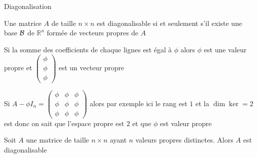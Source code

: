 \begin{parag}{Diagonalisation}
    \begin{theoreme}
        Une matrice $A$ de taille $n \times n$ est diagonalisable si et seulement s'il existe une base $\mathcal{B}$ de $\mathbb{R}^n$ formée de vecteurs propres de $A$
    \end{theoreme}
    \begin{truc}
        Si la somme des coefficients de chaque lignes est égal à $\phi$ alors $\phi$ est une valeur propre et $\begin{pmatrix}
            \phi \\ \phi \\ \phi
        \end{pmatrix}$ est un vecteur propre
    \end{truc}
    \begin{truc}
        Si $A - \phi I_n = \begin{pmatrix}
            \phi & \phi & \phi\\
            \phi & \phi & \phi\\
            \phi & \phi & \phi
        \end{pmatrix}$ alors par exemple ici le rang est $1$ et la $\dim \ker = 2$ est donc on sait que l'espace propre est $2$ et que $\phi$ est valeur propre
    \end{truc}
    \begin{theoreme}
        Soit $A$ une matrice de taille $n \times n$ ayant $n$ valeurs propres distinctes. Alors $A$ est diagonalisable
    \end{theoreme}


\end{parag}

